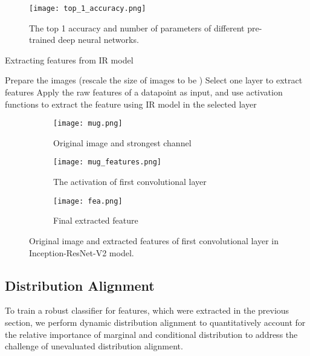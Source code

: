 \documentclass[10pt, conference, compsocconf]{IEEEtran}
\begin{document}
\begin{figure}[h]
\centering
\texttt{[image: top\_1\_accuracy.png]}
\caption{The top 1 accuracy and number of parameters of different pre-trained deep neural networks. }
\label{fig:top-1}
\end{figure}


\begin{algorithm}[h]  
\small
\caption{Extracting features from IR model} \label{alg:Alg.1}  
\begin{algorithmic}[1]
\STATE 
Prepare the images (rescale the size of images to be )
\STATE 
Select one layer to extract features
\STATE 
Apply the raw features of a datapoint as input, and use activation functions to extract the feature using IR model in the selected layer \\
\end{algorithmic}  
\end{algorithm} 


\begin{figure*}[h]
\centering
\begin{subfigure}{0.35\textwidth}
\texttt{[image: mug.png]}
\caption{Original image and strongest  channel} \label{fig:ima}
\end{subfigure}
\begin{subfigure}{0.35\textwidth}
\texttt{[image: mug\_features.png]}
\caption{The activation of first convolutional layer } \label{fig:imb}
\end{subfigure}
\begin{subfigure}{0.22\textwidth}
\texttt{[image: fea.png]}
\caption{Final extracted feature} \label{fig:imc}
\end{subfigure}
\caption{Original image and extracted features of first convolutional layer in Inception-ResNet-V2 model.  } \label{fig:mug}
\end{figure*}



\subsection{Distribution Alignment}
To train a robust classifier for features, which were extracted in the previous section, we perform dynamic distribution alignment to quantitatively account for the relative importance of marginal and conditional distribution to address the challenge of unevaluated distribution alignment.
\end{document}
